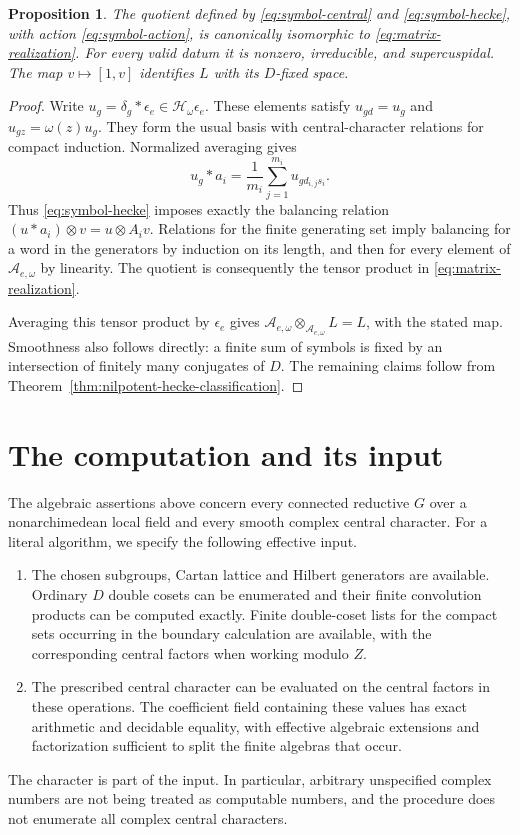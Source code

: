 \documentclass[10pt,letterpaper]{amsart}
\numberwithin{equation}{section}
\newtheorem{proposition}[theorem]{Proposition}
\theoremstyle{remark}
\begin{document}
\begin{proposition}\label{prop:symbol-realization}
The quotient defined by \eqref{eq:symbol-central} and
\eqref{eq:symbol-hecke}, with action \eqref{eq:symbol-action}, is canonically
isomorphic to \eqref{eq:matrix-realization}. For every valid datum it is
nonzero, irreducible, and supercuspidal. The map $v\mapsto[1,v]$ identifies
$L$ with its $D$-fixed space.
\end{proposition}

\begin{proof}
Write $u_g=\delta_g*\epsilon_e\in\mathcal H_\omega\epsilon_e$. These
elements satisfy $u_{gd}=u_g$ and $u_{gz}=\omega(z)u_g$. They form the
usual basis with central-character relations for compact induction.
Normalized averaging gives
\[
 u_g*a_i=\frac1{m_i}\sum_{j=1}^{m_i}u_{g d_{i,j}s_i}.
\]
Thus \eqref{eq:symbol-hecke} imposes exactly the balancing relation
$(u*a_i)\otimes v=u\otimes A_i v$. Relations for the finite generating
set imply balancing for a word in the generators by induction on its
length, and then for every element of $\mathcal A_{e,\omega}$ by linearity.
The quotient is consequently the tensor product in
\eqref{eq:matrix-realization}.

Averaging this tensor product by $\epsilon_e$ gives
$\mathcal A_{e,\omega}\otimes_{\mathcal A_{e,\omega}}L=L$, with the stated
map. Smoothness also follows directly: a finite sum of symbols is fixed
by an intersection of finitely many conjugates of $D$. The remaining
claims follow from Theorem~\ref{thm:nilpotent-hecke-classification}.
\end{proof}

\section{The computation and its input}
\label{sec:effective-input}

The algebraic assertions above concern every connected reductive $G$ over
a nonarchimedean local field and every smooth complex central character.
For a literal algorithm, we specify the following effective input.
\begin{enumerate}
\item The chosen subgroups, Cartan lattice and Hilbert generators are
available. Ordinary $D$ double cosets can be enumerated and their finite
convolution products can be computed exactly. Finite double-coset lists
for the compact sets occurring in the boundary calculation are available,
with the corresponding central factors when working modulo $Z$.
\item The prescribed central character can be evaluated on the central
factors in these operations. The coefficient field containing these
values has exact arithmetic and decidable equality, with effective
algebraic extensions and factorization sufficient to split the finite
algebras that occur.
\end{enumerate}
The character is part of the input. In particular, arbitrary unspecified
complex numbers are not being treated as computable numbers, and the
procedure does not enumerate all complex central characters.
\end{document}
